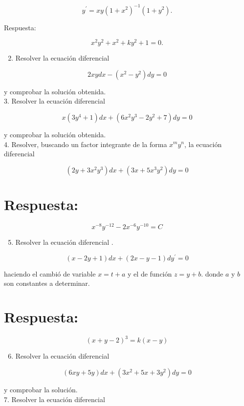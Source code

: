 \documentclass[10pt]{article}
\theoremstyle{plain}
\theoremstyle{definition}
\theoremstyle{remark}
\begin{document}
$$
y^{\prime}=x y\left(1+x^{2}\right)^{-1}\left(1+y^{2}\right) .
$$

Respuesta:

$$
x^{2} y^{2}+x^{2}+k y^{2}+1=0 .
$$

\begin{enumerate}
  \setcounter{enumi}{1}
  \item Resolver la ecuación diferencial
\end{enumerate}

$$
2 x y d x-\left(x^{2}-y^{2}\right) d y=0
$$

y comprobar la solución obtenida.\\
3. Resolver la ecuación diferencial

$$
x\left(3 y^{4}+1\right) d x+\left(6 x^{2} y^{3}-2 y^{2}+7\right) d y=0
$$

y comprobar la solución obtenida.\\
4. Resolver, buscando un factor integrante de la forma $x^{m} y^{n}$, la ecuación diferencial

$$
\left(2 y+3 x^{2} y^{3}\right) d x+\left(3 x+5 x^{3} y^{2}\right) d y=0
$$

\section*{Respuesta:}
$$
x^{-8} y^{-12}-2 x^{-6} y^{-10}=C
$$

\begin{enumerate}
  \setcounter{enumi}{4}
  \item Resolver la ecuación diferencial .
\end{enumerate}

$$
(x-2 y+1) d x+(2 x-y-1) d y^{\prime}=0
$$

haciendo el cambió de variable $x=t+a$ y el de función $z=y+b$. donde $a$ y $b$ son constantes a determinar.

\section*{Respuesta:}
$$
(x+y-2)^{3}=k(x-y)
$$

\begin{enumerate}
  \setcounter{enumi}{5}
  \item Resolver la ecuación diferencial
\end{enumerate}

$$
(6 x y+5 y) d x+\left(3 x^{2}+5 x+3 y^{2}\right) d y=0
$$

y comprobar la solución.\\
7. Resolver la ecuación diferencial
\end{document}
